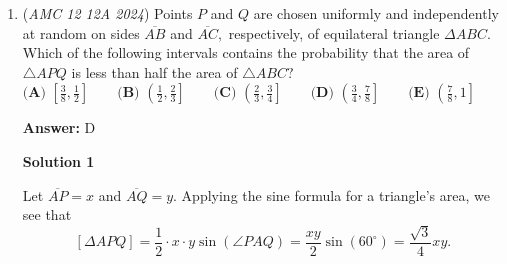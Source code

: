 \begin{enumerate}
 $\frac{7}{\sin 60}$ = $\frac{3}{\sin\angle{BAC}}$ -> Note that $\angle{ABC} = 60^\circ$, due to opposite angles in a cyclic quadrilateral summing to $180^\circ$.$\sin\angle{BAC} = \frac{3\sqrt{3}}{14}$Now note that $\sin^2\theta + \cos^2\theta = 1$

 This allows us to find $\cos\angle{BAC} = \sqrt{1- (\frac{3\sqrt{3}}{14})^2} = \frac{13}{14}$

 Now, LoC again on $\triangle{ABC}$ gives us $AB$:

 Let $AB = x$:$x^2 + 7^2 - 2(7)(x)(\cos\angle{BAC} = 3^2$$x^2 -13x +40 = 0$$x = 5$ and $x = 8$

 Note that at this stage we can deduce that if we would have taken $\cos\angle{BAC} = -\frac{13}{14}$, then $AB$ would have negative values.

 Applying Ptolemy's:

 $15 + 15 = 7(BD)$ -> $BD = \frac{30}{7}$$24 + 15 = 7(BD)$ -> $BD = \frac{39}{7}$

 However, $\frac{30}{7}$ isn't in the options, so we conclude $\boxed{D}$.~ cheltstudentI'm norz

 



\textbf{Solution 6 (Very Short)}

Apply Law of Cosine to $\triangle ACD$ and obtain $AC=7$

 Apply Law of Sine to $\triangle ACD$, that is $\frac{\sin120^\circ}{7}=\frac{\angle CAD}{3}$, so $\sin\angle CAD = \frac{3\sqrt{3}}{14}$



	\item (\textit{AMC 12 12A 2024}) Points $P$ and $Q$ are chosen uniformly and independently at random on sides $\overline {AB}$ and $\overline{AC},$ respectively, of equilateral triangle $\Delta ABC.$ Which of the following intervals contains the probability that the area of $\triangle APQ$ is less than half the area of $\triangle ABC?$
$\textbf{(A) } \left[\frac 38, \frac 12\right] \qquad \textbf{(B) } \left(\frac 12, \frac 23\right] \qquad \textbf{(C) } \left(\frac 23, \frac 34\right] \qquad \textbf{(D) } \left(\frac 34, \frac 78\right] \qquad \textbf{(E) } \left(\frac 78, 1\right]$

 \textbf{Answer: }D



\textbf{Solution 1}

Let $\overline{AP}=x$ and $\overline{AQ}=y$. Applying the sine formula for a triangle's area, we see that 
 \[[\Delta APQ]=\dfrac12\cdot x\cdot y\sin(\angle PAQ)=\dfrac{xy}2\sin(60^\circ)=\dfrac{\sqrt3}4xy.\] 


\end{enumerate}
